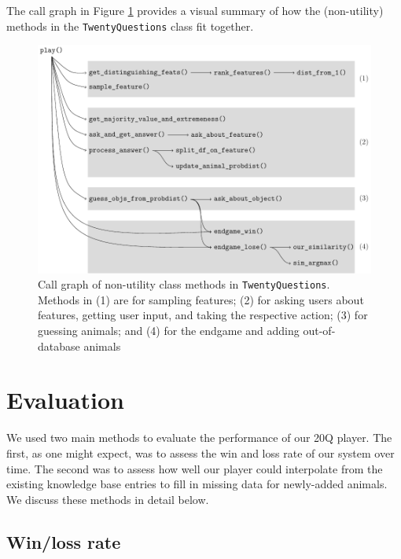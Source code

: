 \documentclass[11pt,a4paper]{article}
\begin{document}
{\vspace{\baselineskip}

\noindent The call graph in Figure \ref{fig:call-graph} provides a visual summary of how the (non-utility) methods in the \texttt{TwentyQuestions} class fit together.

\begin{figure}
\centering
	\includegraphics[width=.9\linewidth]{graphics/call_graph.pdf}
	\caption{Call graph of non-utility class methods in \texttt{TwentyQuestions}. Methods in (1) are for sampling features; (2) for asking users about features, getting user input, and taking the respective action; (3) for guessing animals; and (4) for the endgame and adding out-of-database animals}
	\label{fig:call-graph}
\end{figure}

\section{Evaluation}
\label{sec:eval}

We used two main methods to evaluate the performance of our 20Q player. The first, as one might expect, was to assess the win and loss rate of our system over time. The second was to assess how well our player could interpolate from the existing knowledge base entries to fill in missing data for newly-added animals. We discuss these methods in detail below.

\subsection{Win/loss rate}

}
\end{document}
